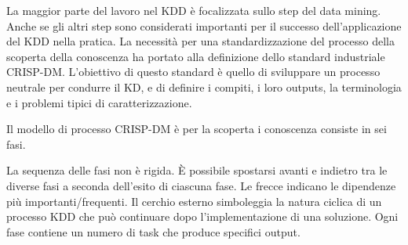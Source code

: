 \documentclass[a4paper]{extarticle}
\begin{document}
La maggior parte del lavoro nel KDD è focalizzata sullo step del data mining. Anche se gli altri step sono considerati importanti per il successo dell'applicazione del KDD nella pratica. La necessità per una standardizzazione del processo della scoperta della conoscenza ha portato alla definizione dello standard industriale CRISP-DM. L'obiettivo di questo standard è quello di sviluppare un processo neutrale per condurre il KD,  e di definire i compiti, i loro outputs, la terminologia e i problemi tipici di caratterizzazione. 

Il modello di processo CRISP-DM è per la scoperta i conoscenza consiste in sei fasi.

\begin{center}


\end{center}

La sequenza delle fasi non è rigida. È possibile spostarsi avanti e indietro tra le diverse fasi a seconda dell'esito di ciascuna fase. Le frecce indicano le dipendenze più importanti/frequenti. Il cerchio esterno simboleggia la natura ciclica di un processo KDD che può continuare dopo l'implementazione di una soluzione. Ogni fase contiene un numero di task che produce specifici output.
\end{document}
